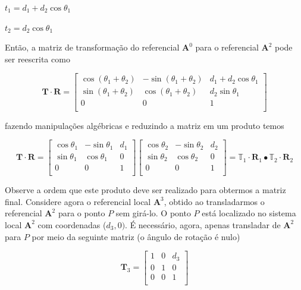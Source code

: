 \centerline{$t_1 = d_1 + d_2\cos\theta_1$}

\centerline{$t_2 = d_2\cos\theta_1$}

Então, a matriz de transformação do referencial $\mathbf{A}^0$ para o referencial $\mathbf{A}^2$ pode ser reescrita como

\[
	\mathbf{T}\cdot\mathbf{R} = \begin{bmatrix}
		\cos(\theta_1 + \theta_2) & -\sin(\theta_1 + \theta_2) & d_1 + d_2\cos\theta_1 \\
		\sin(\theta_1 + \theta_2) & \cos(\theta_1 + \theta_2)  & d_2\sin\theta_1       \\
		0                         & 0                          & 1                     \\
	\end{bmatrix}
\]

\noindent fazendo manipulações algébricas e reduzindo a matriz em um produto temos

\[
	\mathbf{T}\cdot\mathbf{R} = \begin{bmatrix}
		\cos\theta_1 & -\sin\theta_1 & d_1 \\
		\sin\theta_1 & \cos\theta_1  & 0   \\
		0            & 0             & 1   \\
	\end{bmatrix}
	\begin{bmatrix}
		\cos\theta_2 & -\sin\theta_2 & d_2 \\
		\sin\theta_2 & \cos\theta_2  & 0   \\
		0            & 0             & 1   \\
	\end{bmatrix}
	=
	\mathbb{T}_1\cdot\mathbf{R}_1 \bullet \mathbb{T}_2\cdot\mathbf{R}_2
\]

Observe a ordem que este produto deve ser realizado para obtermos a matriz final. Considere agora o referencial local $\mathbf{A}^3$, obtido ao transladarmos o referencial $\mathbf{A}^2$ para o ponto $P$ sem girá-lo. O ponto $P$ está localizado no sistema local $\mathbf{A}^2$ com coordenadas ($d_3, 0)$. É necessário, agora, apenas transladar de $\mathbf{A}^2$ para $P$ por meio da seguinte matriz (o ângulo de rotação é nulo)

\[
	\mathbf{T}_3 = \begin{bmatrix}
		1 & 0 & d_3 \\
		0 & 1 & 0   \\
		0 & 0 & 1   \\
	\end{bmatrix}
\]

